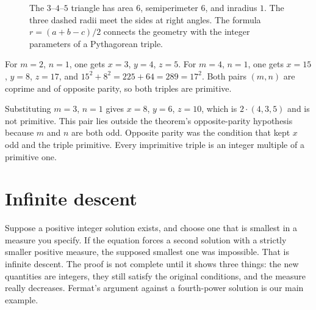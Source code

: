 \begin{figure}[ht]
\centering
{}
\caption{The $3$--$4$--$5$ triangle has area $6$, semiperimeter $6$, and inradius $1$. The three dashed radii meet the sides at right angles. The formula $r=(a+b-c)/2$ connects the geometry with the integer parameters of a Pythagorean triple.}
\label{fig:incircle}
\end{figure}

\begin{examplex}
For $m=2$, $n=1$, one gets $x=3$, $y=4$, $z=5$.
For $m=4$, $n=1$, one gets $x=15$, $y=8$, $z=17$, and $15^2+8^2=225+64=289=17^2$.
Both pairs $(m,n)$ are coprime and of opposite parity, so both triples are primitive.
\end{examplex}

\begin{examplex}
Substituting $m=3$, $n=1$ gives $x=8$, $y=6$, $z=10$, which is $2\cdot(4,3,5)$ and is not primitive. This pair lies outside the theorem's opposite-parity hypothesis because $m$ and $n$ are both odd. Opposite parity was the condition that kept $x$ odd and the triple primitive. Every imprimitive triple is an integer multiple of a primitive one.
\end{examplex}

\section{Infinite descent}

Suppose a positive integer solution exists, and choose one that is smallest in a measure you specify. If the equation forces a second solution with a strictly smaller positive measure, the supposed smallest one was impossible. That is infinite descent. The proof is not complete until it shows three things: the new quantities are integers, they still satisfy the original conditions, and the measure really decreases. Fermat's argument against a fourth-power solution is our main example.

